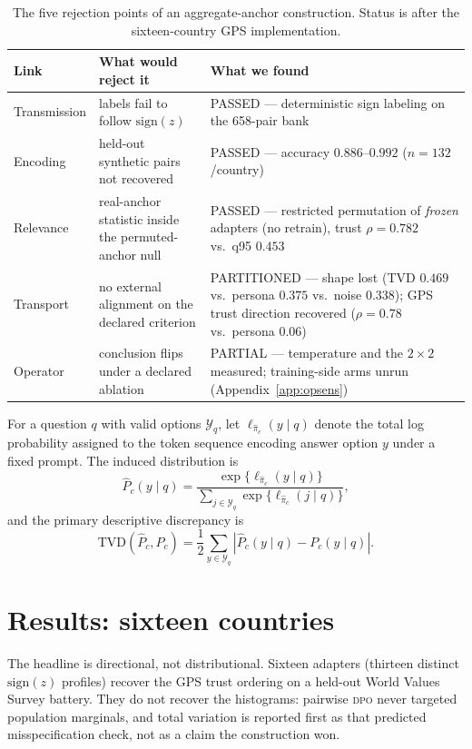\documentclass[10pt,letterpaper]{article}
\newcommand{\DPO}{\textsc{dpo}}
\begin{document}
\begin{table}[H]
\centering\small
\caption{The five rejection points of an aggregate-anchor construction. Status is after the sixteen-country GPS implementation.}\label{tab:tests}
\begin{tabularx}{\textwidth}{@{}p{2.1cm}p{3.4cm}X@{}}
\toprule
\textbf{Link} & \textbf{What would reject it} & \textbf{What we found}\\
\midrule
Transmission & labels fail to follow $\mathrm{sign}(z)$ & PASSED --- deterministic sign labeling on the 658-pair bank\\
Encoding & held-out synthetic pairs not recovered & PASSED --- accuracy $0.886$--$0.992$ ($n=132$/country)\\
Relevance & real-anchor statistic inside the permuted-anchor null & PASSED --- restricted permutation of \emph{frozen} adapters (no retrain), trust $\rho=0.782$ vs.\ q95 $0.453$\\
Transport & no external alignment on the declared criterion & PARTITIONED --- shape lost (TVD $0.469$ vs.\ persona $0.375$ vs.\ noise $0.338$); GPS trust direction recovered ($\rho=0.78$ vs.\ persona $0.06$)\\
Operator & conclusion flips under a declared ablation & PARTIAL --- temperature and the $2\times2$ measured; training-side arms unrun (Appendix~\ref{app:opsens})\\
\bottomrule
\end{tabularx}
\end{table}

For a question $q$ with valid options $\mathcal{Y}_q$, let $\ell_{\widehat\pi_c}(y\mid q)$ denote the total log probability assigned to the token sequence encoding answer option $y$ under a fixed prompt. The induced distribution is
\begin{equation}
\widehat P_c(y\mid q)=\frac{\exp\{\ell_{\widehat\pi_c}(y\mid q)\}}{\sum_{j\in\mathcal{Y}_q}\exp\{\ell_{\widehat\pi_c}(j\mid q)\}},
\label{eq:choiceprob}
\end{equation}
and the primary descriptive discrepancy is
\begin{equation}
\mathrm{TVD}(\widehat P_c,P_c)=\frac{1}{2}\sum_{y\in\mathcal{Y}_q}|\widehat P_c(y\mid q)-P_c(y\mid q)|.
\label{eq:tvd}
\end{equation}

\section{Results: sixteen countries}
The headline is directional, not distributional. Sixteen adapters (thirteen distinct $\mathrm{sign}(z)$ profiles) recover the GPS trust ordering on a held-out World Values Survey battery. They do not recover the histograms: pairwise \DPO{} never targeted population marginals, and total variation is reported first as that predicted misspecification check, not as a claim the construction won.
\end{document}

